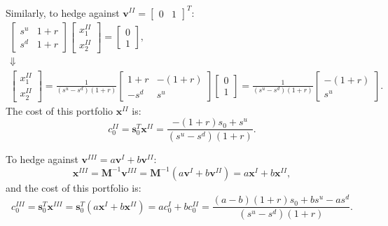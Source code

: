 \documentclass[final,3p,times]{elsarticle}
\begin{document}
	Similarly, to hedge against $\mathbf{v}^{II}=\begin{bmatrix} 0 & 1\end{bmatrix}^T$:
	\begin{gather}
		\begin{bmatrix} s^u & 1+r \\ s^d & 1+r \end{bmatrix}
		\begin{bmatrix} x^{II}_1 \\ x^{II}_2 \end{bmatrix}
		=
		\begin{bmatrix} 0 \\ 1 \end{bmatrix},\nonumber\\
		\Downarrow\nonumber\\
		\begin{bmatrix} x^{II}_1 \\ x^{II}_2 \end{bmatrix}
		=
		\frac{1}{\left(s^u-s^d\right)\left(1+r\right)}
		\begin{bmatrix} 1+r & -\left(1+r\right) \\ -s^d & s^u \end{bmatrix}
		\begin{bmatrix} 0 \\ 1 \end{bmatrix}
		=
		\frac{1}{\left(s^u-s^d\right)\left(1+r\right)}
		\begin{bmatrix} -\left(1+r\right) \\ s^u \end{bmatrix}
		.
	\end{gather}
	The cost of this portfolio $\mathbf{x}^{II}$ is:
	\begin{equation}
		c_0^{II}=\mathbf{s}_0^T\mathbf{x}^{II}=\frac{-\left(1+r\right)s_0 + s^u}{\left(s^u-s^d\right)\left(1+r\right)}
		.
	\end{equation}
	
	To hedge against $\mathbf{v}^{III}=a\mathbf{v}^{I}+b\mathbf{v}^{II}$:
	\begin{equation}
		\mathbf{x}^{III}
		=\mathbf{M}^{-1}\mathbf{v}^{III}
		=\mathbf{M}^{-1}\left(a\mathbf{v}^{I}+b\mathbf{v}^{II}\right)
		=a\mathbf{x}^{I}+b\mathbf{x}^{II}
		,
	\end{equation}
	and the cost of this portfolio is:
	\begin{equation}
		c_0^{III}
		=\mathbf{s}_0^T\mathbf{x}^{III}
		=\mathbf{s}_0^T\left(a\mathbf{x}^{I}+b\mathbf{x}^{II}\right)
		=ac_0^{I}+bc_0^{II}
		=\frac{\left(a-b\right)\left(1+r\right)s_0 + b s^u - a s^d}{\left(s^u-s^d\right)\left(1+r\right)}
		.
	\end{equation}
	
\end{document}
